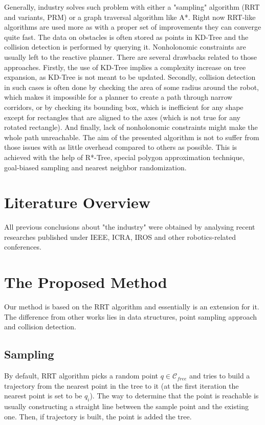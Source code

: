 \documentclass[12pt]{article}
\DeclareRobustCommand{\[}{\begin{equation}}
\DeclareRobustCommand{\]}{\end{equation}}
\numberwithin{equation}{section}
\begin{document}
Generally, industry solves such problem with either a "sampling" algorithm (RRT and variants, PRM) or a graph traversal algorithm like A*. Right now RRT-like algorithms are used more as with a proper set of improvements they can converge quite fast. The data on obstacles is often stored as points in KD-Tree and the collision detection is performed by querying it. Nonholonomic constraints are usually left to the reactive planner. There are several
drawbacks related to those approaches. Firstly, the use of KD-Tree implies a complexity increase on tree expansion, as KD-Tree is not meant to be updated. Secondly, collision detection in such cases is often done by checking the area of some radius around the robot, which makes it impossible for a planner to create a path through narrow corridors, or by checking its bounding box, which is inefficient for any shape except for rectangles that are aligned to the axes (which is not true for any rotated rectangle). And finally, lack of nonholonomic constraints might make the whole path unreachable. The aim of the presented algorithm is not to suffer from those issues with as little overhead compared to others as possible.
This is achieved with the help of R*-Tree, special polygon approximation technique, goal-biased sampling and nearest neighbor randomization.

\section{Literature Overview}

All previous conclusions about "the industry" were obtained by analysing recent researches published under IEEE, ICRA, IROS and other robotics-related conferences.

\section{The Proposed Method}
Our method is based on the RRT algorithm and essentially is an extension for it. The difference from other works lies in data structures,
point sampling approach and collision detection.

\subsection{Sampling}

By default, RRT algorithm picks a random point $q\in\mathcal{C}_{free}$ and tries to build a trajectory from the nearest point in the tree to it (at the first iteration the
nearest point is set to be $q_i$).
The way to determine that the point is reachable is usually constructing a straight line between the sample point and the existing one.
Then, if trajectory is built, the point is added the tree.
\end{document}

